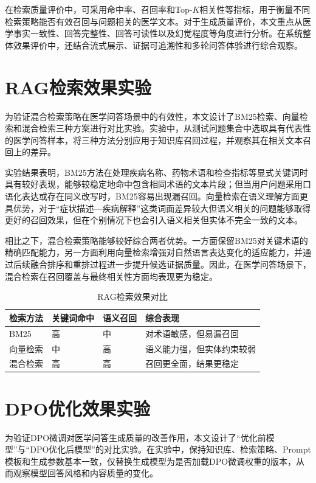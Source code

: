 在检索质量评价中，可采用命中率、召回率和Top-$K$相关性等指标，用于衡量不同检索策略能否有效召回与问题相关的医学文本。对于生成质量评价，本文重点从医学事实一致性、回答完整性、回答可读性以及幻觉程度等角度进行分析。在系统整体效果评价中，还结合流式展示、证据可追溯性和多轮问答体验进行综合观察。

\section{RAG检索效果实验}

为验证混合检索策略在医学问答场景中的有效性，本文设计了BM25检索、向量检索和混合检索三种方案进行对比实验。实验中，从测试问题集合中选取具有代表性的医学问答样本，将三种方法分别应用于知识库召回过程，并观察其在相关文本召回上的差异。

实验结果表明，BM25方法在处理疾病名称、药物术语和检查指标等显式关键词时具有较好表现，能够较稳定地命中包含相同术语的文本片段；但当用户问题采用口语化表达或存在同义改写时，BM25容易出现漏召回。向量检索在语义理解方面更具优势，对于“症状描述—疾病解释”这类词面差异较大但语义相关的问题能够取得更好的召回效果，但在个别情况下也会引入语义相关但实体不完全一致的文本。

相比之下，混合检索策略能够较好综合两者优势。一方面保留BM25对关键术语的精确匹配能力，另一方面利用向量检索增强对自然语言表达变化的适应能力，并通过后续融合排序和重排过程进一步提升候选证据质量。因此，在医学问答场景下，混合检索在召回覆盖与最终相关性方面均表现更为稳定。

\begin{table}[htbp]
    \caption[RAG检索效果对比]{RAG检索效果对比}
    \centering
    \begin{tabular}{llll}
        \toprule
        检索方法 & 关键词命中 & 语义召回 & 综合表现 \\
        \midrule
        BM25 & 高 & 中 & 对术语敏感，但易漏召回 \\
        向量检索 & 中 & 高 & 语义能力强，但实体约束较弱 \\
        混合检索 & 高 & 高 & 召回更全面，结果更稳定 \\
        \bottomrule
    \end{tabular}
    \label{tab:rag-retrieval-compare}
\end{table}

\section{DPO优化效果实验}

为验证DPO微调对医学问答生成质量的改善作用，本文设计了“优化前模型”与“DPO优化后模型”的对比实验。在实验中，保持知识库、检索策略、Prompt模板和生成参数基本一致，仅替换生成模型为是否加载DPO微调权重的版本，从而观察模型回答风格和内容质量的变化。

